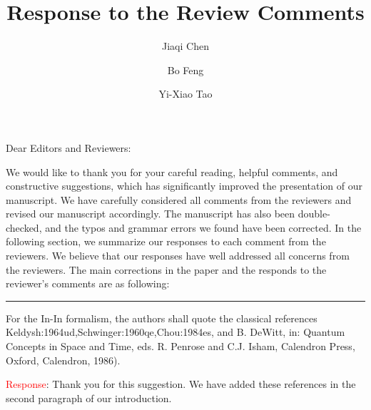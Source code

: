 \documentclass[12pt,superscriptaddress]{revtex4}
\begin{document}
	
	
	\title{Response to the Review Comments}
    \author{Jiaqi Chen}
    \author{Bo Feng}
	\author{Yi-Xiao Tao}
	
	
	\maketitle

\noindent Dear Editors and Reviewers:
	
We would like to thank you for your careful reading, helpful comments, and constructive suggestions, which has significantly improved the presentation of our manuscript. We have carefully considered all comments from the reviewers and revised our manuscript accordingly. The manuscript has also been double-checked, and the typos and grammar errors we found have been corrected. In the following section, we summarize our responses to each comment from the reviewers. We believe that our responses have well addressed all concerns from the reviewers. The main corrections in the paper and the responds to the reviewer's comments are as following:

\noindent\rule[0.25\baselineskip]{\textwidth}{1pt}

\begin{center}
{
	\parbox{1\linewidth}
	{		
		 For the In-In formalism, the authors shall quote the classical references
 Keldysh:1964ud,Schwinger:1960qe,Chou:1984es, and B. DeWitt, in: Quantum Concepts in Space and Time, eds. R. Penrose and C.J. Isham, Calendron
 Press, Oxford, Calendron, 1986).

	}
}
\end{center}
\noindent\textcolor{red}{Response}:
Thank you for this suggestion. We have added these references in the second paragraph of our introduction.
\end{document}
